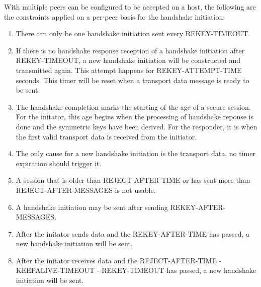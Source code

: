   With multiple peers can be configured to be accepted on a host, the following are the constraints
  applied on a per-peer basis for the handshake initiation:
  \begin{enumerate}
    \item There can only be one handshake initiation sent every \uppercase{REKEY-TIMEOUT}.
    \item If there is no handshake response reception of a handshake initiation after \uppercase{rekey-timeout},
    a new handshake initiation will be constructed and transmitted again. This attempt happens
    for \uppercase{REKEY-attempt-time} seconds. This timer will be reset when a transport data
    message is ready to be sent.
    \item The handshake completion marks the starting of the age of a secure session. For the initator,
    this age begins when the processing of handshake reponse is done and the symmetric keys have
    been derived. For the responder, it is when the first valid transport data is received from
    the initiator.
    \item The only cause for a new handshake initiation is the transport data, no timer expiration
    should trigger it.
    \item A session that is older than \uppercase{reject-after-time} or has sent more than \uppercase{REJECT-AFTER-MESSAGES}
    is not usable.
    \item A handshake initiation may be sent after sending \uppercase{Rekey-after-messages}.
    \item After the initator sends data and the \uppercase{Rekey-after-time} has passed, 
    a new handshake initiation will be sent.
    \item After the initator receives data and the \uppercase{Reject-after-time} - \uppercase{keepalive-timeout} 
    - \uppercase{rekey-timeout} has passed, a new handshake initiation will be sent.


  \end{enumerate}